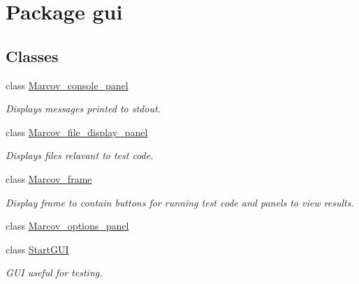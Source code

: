 \hypertarget{namespacegui}{}\section{Package gui}
\label{namespacegui}
\subsection*{Classes}
\begin{DoxyCompactItemize}
\item 
class \hyperlink{classgui_1_1_marcov__console__panel}{Marcov\+\_\+console\+\_\+panel}
\begin{DoxyCompactList}\small\item\em Displays messages printed to stdout. \end{DoxyCompactList}\item 
class \hyperlink{classgui_1_1_marcov__file__display__panel}{Marcov\+\_\+file\+\_\+display\+\_\+panel}
\begin{DoxyCompactList}\small\item\em Displays files relavant to test code. \end{DoxyCompactList}\item 
class \hyperlink{classgui_1_1_marcov__frame}{Marcov\+\_\+frame}
\begin{DoxyCompactList}\small\item\em Display frame to contain buttons for running test code and panels to view results. \end{DoxyCompactList}\item 
class \hyperlink{classgui_1_1_marcov__options__panel}{Marcov\+\_\+options\+\_\+panel}
\item 
class \hyperlink{classgui_1_1_start_g_u_i}{Start\+G\+UI}
\begin{DoxyCompactList}\small\item\em G\+UI useful for testing. \end{DoxyCompactList}\end{DoxyCompactItemize}
